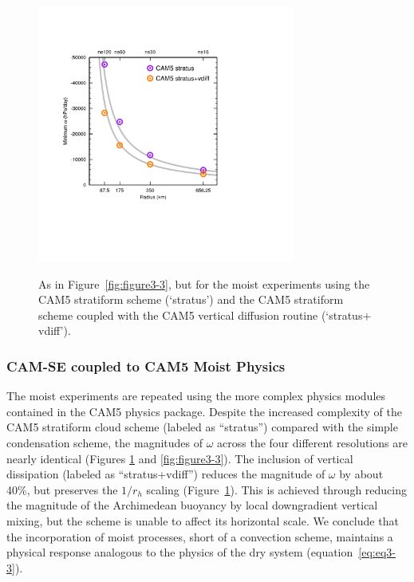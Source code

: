 \begin{figure}[t]
\begin{center}
\noindent\includegraphics[width=20pc,angle=0]{chapter3/Figure5_crop.pdf}\\
\end{center}
\caption{As in Figure~\ref{fig:figure3-3}, but for the moist experiments using the CAM5 stratiform scheme (‘stratus’) and the CAM5 stratiform scheme coupled with the CAM5 vertical diffusion routine (‘stratus$+$vdiff’).}
\label{fig:figure3-5}
\end{figure}

\subsubsection{CAM-SE coupled to CAM5 Moist Physics}
The moist experiments are repeated using the more complex physics modules contained in the CAM5 physics package. Despite the increased complexity of the CAM5 stratiform cloud scheme (labeled as “stratus”) compared with the simple condensation scheme, the magnitudes of $\omega$ across the four different resolutions are nearly identical (Figures \ref{fig:figure3-5} and \ref{fig:figure3-3}). The inclusion of vertical dissipation (labeled as “stratus+vdiff”) reduces the magnitude of $\omega$ by about 40\%, but preserves the $1/r_h$ scaling (Figure~\ref{fig:figure3-5}). This is achieved through reducing the magnitude of the Archimedean buoyancy by local downgradient vertical mixing, but the scheme is unable to affect its horizontal scale. We conclude that the incorporation of moist processes, short of a convection scheme, maintains a physical response analogous to the physics of the dry system (equation~\ref{eq:eq3-3}).

